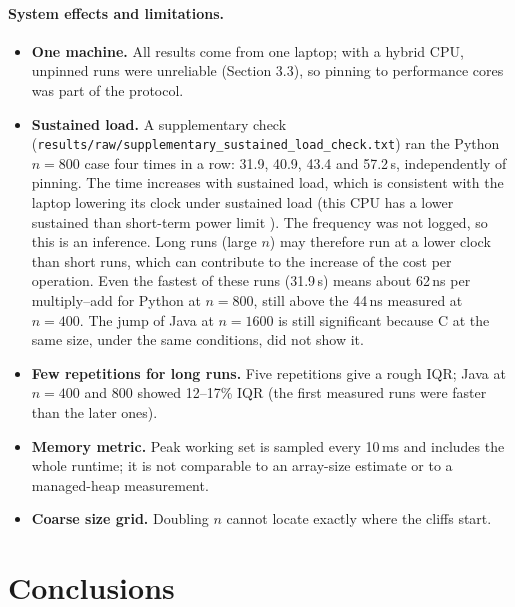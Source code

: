 \documentclass[11pt,a4paper]{article}
\begin{document}
\paragraph{System effects and limitations.}
\begin{itemize}
  \item \textbf{One machine.} All results come from one laptop; with a hybrid CPU,
        unpinned runs were unreliable (Section 3.3), so pinning to performance cores was
        part of the protocol.
  \item \textbf{Sustained load.} A supplementary check (\texttt{results/raw/supplementary\_sustained\_load\_check.txt})
        ran the Python $n=800$ case four times in a row: 31.9, 40.9, 43.4 and 57.2\,s,
        independently of pinning. The time increases with sustained load, which is
        consistent with the laptop lowering its clock under sustained load (this CPU
        has a lower sustained than short-term power limit \cite{intel}). The
        frequency was not logged, so this is an inference. Long runs (large $n$) may
        therefore run at a lower clock than short runs, which can contribute to the
        increase of the cost per operation. Even the fastest of these runs (31.9\,s) means
        about 62\,ns per multiply--add for Python at $n = 800$, still above the 44\,ns
        measured at $n = 400$. The jump of Java at $n=1600$ is still
        significant because C at the same size, under the same conditions, did not show it.
  \item \textbf{Few repetitions for long runs.} Five repetitions give a rough IQR; Java at
        $n = 400$ and $800$ showed 12--17\% IQR (the first measured runs were faster than the
        later ones).
  \item \textbf{Memory metric.} Peak working set is sampled every 10\,ms and includes the
        whole runtime; it is not comparable to an array-size estimate or to a managed-heap
        measurement.
  \item \textbf{Coarse size grid.} Doubling $n$ cannot locate exactly where the cliffs
        start.
\end{itemize}

\section{Conclusions}
\end{document}
